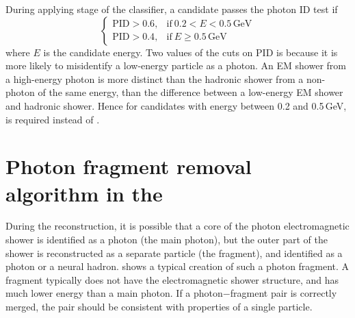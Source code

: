 During applying stage of the classifier, a candidate passes the photon ID test if
\begin{equation}
\begin{cases}
  \text{PID} > 0.6, & \text{if}\ 0.2 < E < 0.5\,\text{GeV}\\
  \text{PID} > 0.4, & \text{if}\ E \geqslant 0.5\,\text{GeV}
\end{cases}
\end{equation}
where $E$ is the candidate energy. Two values of the cuts on $\text{PID}$ is because it is more likely to misidentify a low-energy particle as a photon. An EM shower from a high-energy photon is more distinct than the hadronic shower from a non-photon of the same energy, than the difference between a low-energy  EM shower and hadronic shower. Hence for candidates with energy between 0.2 and 0.5\,GeV,  is required instead of .




\section{Photon fragment removal algorithm in the \ECAL}
\label{sec:photonFragRemoval}
During the reconstruction, it is possible that a core of the photon electromagnetic shower is identified as a photon (the main photon), but the outer part of the shower is reconstructed as a separate particle (the fragment), and identified as a photon or a neural hadron.  shows a typical creation of such a photon fragment. A fragment typically does not have the electromagnetic shower structure, and has much lower energy than a main photon. If a photon$-$fragment pair is correctly merged, the pair should be consistent with properties of a single particle.

